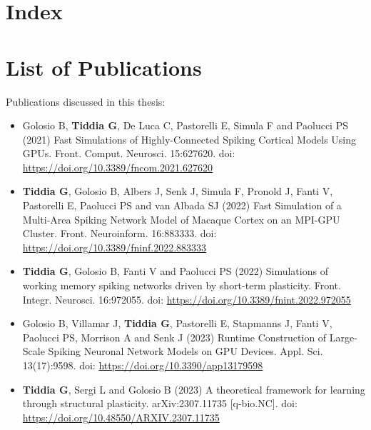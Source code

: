 \documentclass[a4paper, 12pt, twoside, openright]{book}
\begin{document}
\mainmatter
\chapter*{Index}
\makeatletter
{}
\makeatother
\newcommand{\fncyblank }{\fancyhf{}}



\chapter*{List of Publications}
Publications discussed in this thesis:
\begin{itemize}
    \item \cite{Golosio2021} Golosio B, \textbf{Tiddia G}, De Luca C, Pastorelli E, Simula F and Paolucci PS (2021) Fast Simulations of Highly-Connected Spiking Cortical Models Using GPUs. Front. Comput. Neurosci. 15:627620. doi: \url{https://doi.org/10.3389/fncom.2021.627620}
    \item \cite{Tiddia2022} \textbf{Tiddia G}, Golosio B, Albers J, Senk J, Simula F, Pronold J, Fanti V, Pastorelli E, Paolucci PS and van Albada SJ (2022) Fast Simulation of a Multi-Area Spiking Network Model of Macaque Cortex on an MPI-GPU Cluster. Front. Neuroinform. 16:883333. doi: \url{https://doi.org/10.3389/fninf.2022.883333}
    \item \cite{Tiddia2022_WM} \textbf{Tiddia G}, Golosio B, Fanti V and Paolucci PS (2022) Simulations of working memory spiking networks driven by short-term plasticity. Front. Integr. Neurosci. 16:972055. doi: \url{https://doi.org/10.3389/fnint.2022.972055}
    \item \cite{Golosio2023} Golosio B, Villamar J, \textbf{Tiddia G}, Pastorelli E, Stapmanns J, Fanti V, Paolucci PS, Morrison A and Senk J (2023) Runtime Construction of Large-Scale Spiking Neuronal Network Models on GPU Devices. Appl. Sci. 13(17):9598. doi: \url{https://doi.org/10.3390/app13179598}
    \item \cite{Tiddia2023} \textbf{Tiddia G}, Sergi L and Golosio B (2023) A theoretical framework for learning through structural plasticity.  arXiv:2307.11735 [q-bio.NC]. doi: \url{https://doi.org/10.48550/ARXIV.2307.11735}
\end{itemize}
\end{document}
